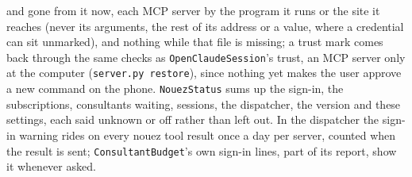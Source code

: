 \documentclass[10pt,a4paper]{article}
\newcommand{\code}[1]{\texttt{#1}}
\begin{document}
and gone from it now, each MCP server by the program it runs or the site it reaches (never its
arguments, the rest of its address or a value, where a credential can sit unmarked), and nothing while
that file is missing; a trust mark comes back through the same checks as \code{OpenClaudeSession}'s
trust, an MCP server only at the computer (\code{server.py restore}), since nothing yet makes the user
approve a new command on the phone. \code{NouezStatus} sums up the sign-in, the subscriptions,
consultants waiting, sessions, the dispatcher, the version and these settings, each said unknown or
off rather than left out. In the dispatcher the sign-in warning rides on every nouez tool result
once a day per server, counted when the result is sent; \code{ConsultantBudget}'s own sign-in lines,
part of its report, show it whenever asked.
\end{document}
